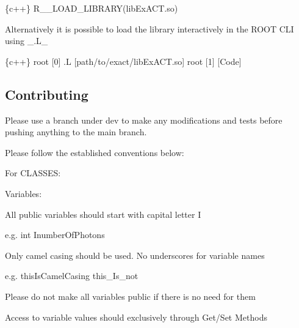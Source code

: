 \begin{DoxyCode}
\{c++\}
R\_\_LOAD\_LIBRARY(libExACT.so)
\end{DoxyCode}


Alternatively it is possible to load the library interactively in the R\+O\+OT C\+LI using \+\_\+.\+L\+\_\+


\begin{DoxyCode}
\{c++\}
root [0] .L [path/to/exact/libExACT.so]
root [1] [Code]
\end{DoxyCode}


\subsection*{Contributing}

Please use a branch under dev to make any modifications and tests before pushing anything to the main branch.

Please follow the established conventions below\+:

For C\+L\+A\+S\+S\+ES\+:

Variables\+:
\begin{DoxyItemize}
\item All public variables should start with capital letter I

e.\+g. int Inumber\+Of\+Photons
\item Only camel casing should be used. No underscores for variable names

e.\+g. this\+Is\+Camel\+Casing this\+\_\+\+Is\+\_\+not
\item Please do not make all variables public if there is no need for them
\item Access to variable values should exclusively through Get/\+Set Methods
\end{DoxyItemize}

